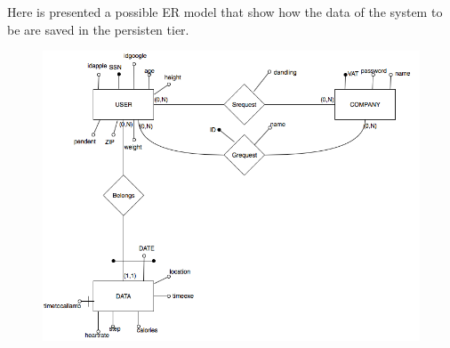 \documentclass{article}
\begin{document}
\newpage
Here is presented a possible ER model that show how the data of the system to be are saved in the persisten tier. 
\begin{figure}[h!]
\centering
    \textbf{}\par\medskip
	\includegraphics[width= \linewidth]{ER.png}
\end{figure}
\newpage
\end{document}
